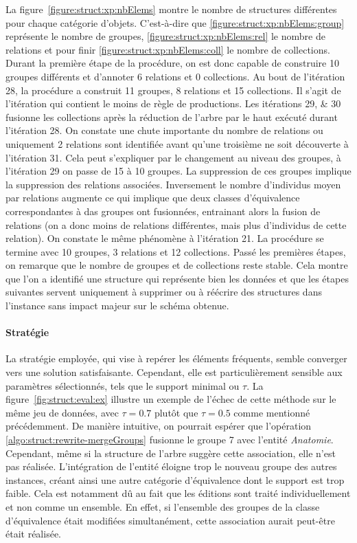 La figure~\ref{figure:struct:xp:nbElems} montre le nombre de structures différentes pour chaque catégorie d'objets.
C'est-à-dire que \ref{figure:struct:xp:nbElems:group} représente le nombre de groupes, \ref{figure:struct:xp:nbElems:rel} le nombre de relations et pour finir \ref{figure:struct:xp:nbElems:coll} le nombre de collections.
Durant la première étape de la procédure, on est donc capable de construire \num{10} groupes différents et d'annoter \num{6} relations et \num{0} collections.
Au bout de l'itération \num{28}, la procédure a construit \num{11} groupes, \num{8} relations et \num{15} collections.
Il s'agit de l'itération qui contient le moins de règle de productions.
Les itérations \numlist{29;30} fusionne les collections après la réduction de l'arbre par le haut exécuté durant l'itération \num{28}.
On constate une chute importante du nombre de relations ou uniquement \num{2} relations sont identifiée avant qu'une troisième ne soit découverte à l'itération \num{31}.
Cela peut s'expliquer par le changement au niveau des groupes, à l'itération \num{29} on passe de \num{15} à \num{10} groupes.
La suppression de ces groupes implique la suppression des relations associées.
Inversement le nombre d'individus moyen par relations augmente ce qui implique que deux classes d'équivalence correspondantes à das groupes ont fusionnées, entrainant alors la fusion de relations (on a donc moins de relations différentes, mais plus d'individus de cette relation).
On constate le même phénomène à l'itération \num{21}.
La procédure se termine avec \num{10} groupes, \num{3} relations et \num{12} collections.
Passé les premières étapes, on remarque que le nombre de groupes et de collections reste stable.
Cela montre que l'on a identifié une structure qui représente bien les données et que les étapes suivantes servent uniquement à supprimer ou à réécrire des structures dans l'instance sans impact majeur sur le schéma obtenue.

\paragraph{Stratégie}
La stratégie employée, qui vise à repérer les éléments fréquents, semble converger vers une solution satisfaisante.
Cependant, elle est particulièrement sensible aux paramètres sélectionnés, tels que le support minimal ou $\tau$.
La figure~\ref{fig:struct:eval:ex} illustre un exemple de l'échec de cette méthode sur le même jeu de données, avec $\tau = 0.7$ plutôt que $\tau=0.5$ comme mentionné précédemment.
De manière intuitive, on pourrait espérer que l'opération \ref{algo:struct:rewrite-mergeGroups} fusionne le groupe 7 avec l'entité \emph{Anatomie}.
Cependant, même si la structure de l'arbre suggère cette association, elle n'est pas réalisée.
L'intégration de l'entité éloigne trop le nouveau groupe des autres instances, créant ainsi une autre catégorie d'équivalence dont le support est trop faible.
Cela est notamment dû au fait que les éditions sont traité individuellement et non comme un ensemble.
En effet, si l'ensemble des groupes de la classe d'équivalence était modifiées simultanément, cette association aurait peut-être était réalisée.

